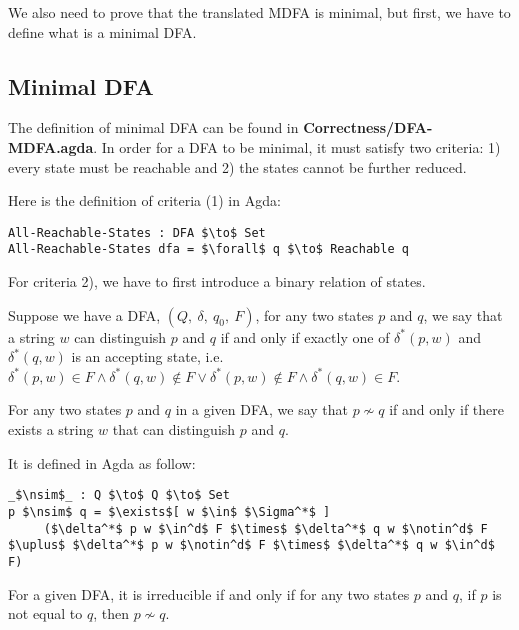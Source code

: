 \par We also need to prove that the translated MDFA is minimal, but
first, we have to define what is a minimal DFA. 


\subsection{Minimal DFA}
\par The definition of minimal DFA can be found in
\textbf{Correctness/DFA-MDFA.agda}. In order for a DFA to be minimal,
it must satisfy two criteria: 1) every state must be reachable and 2) the
states cannot be further reduced. 

\par Here is the definition of criteria (1) in Agda: 
\begin{lstlisting}[mathescape=true,xleftmargin=.3\textwidth]
All-Reachable-States : DFA $\to$ Set
All-Reachable-States dfa = $\forall$ q $\to$ Reachable q
\end{lstlisting}

\par For criteria 2), we have to first introduce a binary relation of states. 
\begin{defn}
\noindent Suppose we have a DFA, \((Q,\ \delta,\ q_0,\ F)\), for any two states \(p\) and \(q\), we say that a string
\(w\) can distinguish \(p\) and \(q\) if and only if exactly one of
\(\delta^*(p,w)\) and \(\delta^*(q,w)\) is an accepting state,
i.e. \(\delta^*(p,w) \in F \wedge \delta^*(q,w) \notin F \vee
\delta^*(p,w) \notin F \wedge \delta^*(q,w) \in F\). 
\end{defn}

\begin{defn}
\noindent For any two states \(p\) and \(q\) in a given DFA, we say that \(p \nsim
q\) if and only if there exists a string \(w\) that can distinguish
\(p\) and \(q\). 
\end{defn}

\par It is defined in Agda as follow:
\begin{lstlisting}[mathescape=true,xleftmargin=.3\textwidth]
_$\nsim$_ : Q $\to$ Q $\to$ Set
p $\nsim$ q = $\exists$[ w $\in$ $\Sigma^*$ ] 
     ($\delta^*$ p w $\in^d$ F $\times$ $\delta^*$ q w $\notin^d$ F $\uplus$ $\delta^*$ p w $\notin^d$ F $\times$ $\delta^*$ q w $\in^d$ F)
\end{lstlisting}

\begin{defn}
\noindent For a given DFA, it is irreducible if and only if for any
two states \(p\) and \(q\), if \(p\) is not equal to \(q\), then \(p \nsim q\). 
\end{defn}

